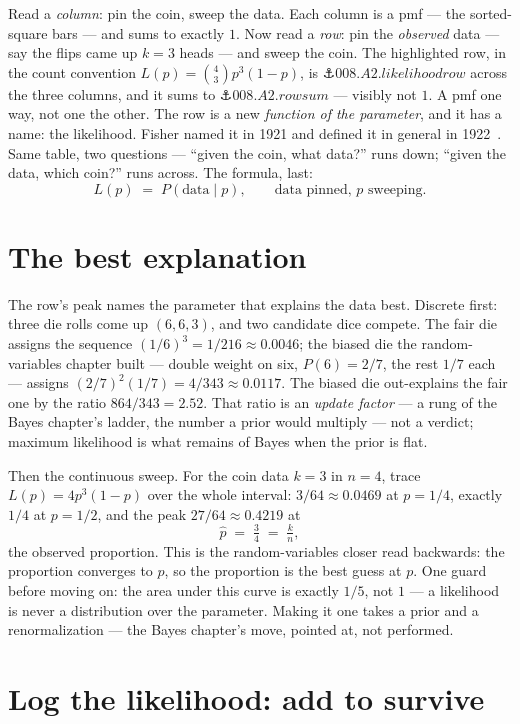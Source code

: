 \begin{narrative}
Read a \emph{column}: pin the coin, sweep the data. Each column is a
pmf — the sorted-square bars — and sums to exactly $1$. Now read a
\emph{row}: pin the \emph{observed} data — say the flips came up
$k = 3$ heads — and sweep the coin. The highlighted row, in the count
convention $L(p) = \binom{4}{3} p^3 (1-p)$, is
$\anchor{008.A2.likelihoodrow}$ across the three columns, and it sums
to $\anchor{008.A2.rowsum}$ — visibly not $1$. A pmf one way, not one
the other. The row is a new \emph{function of the parameter}, and it
has a name: the likelihood. Fisher named it in 1921 and defined it in
general in 1922~\cite{probability-john-aldrich-r-a-fisher-and-the-making-of-maximum-likelihood}.
Same table, two questions — ``given the coin, what data?'' runs down;
``given the data, which coin?'' runs across. The formula, last:
\[
  L(p) \;=\; P(\text{data} \mid p),
  \qquad \text{data pinned, } p \text{ sweeping}.
\]

\section{The best explanation}

The row's peak names the parameter that explains the data best.
Discrete first: three die rolls come up $(6, 6, 3)$, and two candidate
dice compete. The fair die assigns the sequence
$(1/6)^3 = 1/216 \approx 0.0046$; the biased die the
random-variables chapter built — double weight on six, $P(6) = 2/7$,
the rest $1/7$ each — assigns $(2/7)^2 (1/7) = 4/343 \approx 0.0117$.
The biased die out-explains the fair one by the ratio
$864/343 = 2.52$. That ratio is an \emph{update factor} — a rung of
the Bayes chapter's ladder, the number a prior would multiply — not a
verdict; maximum likelihood is what remains of Bayes when the prior
is flat.

Then the continuous sweep. For the coin data $k = 3$ in $n = 4$, trace
$L(p) = 4p^3(1-p)$ over the whole interval: $3/64 \approx 0.0469$ at
$p = 1/4$, exactly $1/4$ at $p = 1/2$, and the peak
$27/64 \approx 0.4219$ at
\[
  \hat{p} \;=\; \tfrac{3}{4} \;=\; \tfrac{k}{n},
\]
the observed proportion. This is the random-variables closer read
backwards: the proportion converges to $p$, so the proportion is the
best guess at $p$. One guard before moving on: the area under this
curve is exactly $1/5$, not $1$ — a likelihood is never a
distribution over the parameter. Making it one takes a prior and a
renormalization — the Bayes chapter's move, pointed at, not
performed.

\section{Log the likelihood: add to survive}


\end{narrative}
